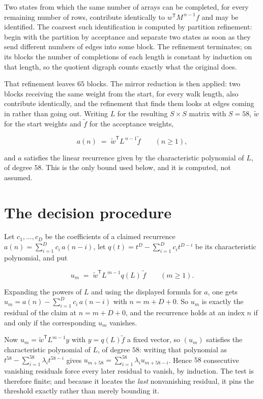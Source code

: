 \documentclass[11pt]{article}
\theoremstyle{definition}
\begin{document}
Two states from which the same number of arrays can be completed, for every remaining number of rows, contribute identically to $w^{\mathsf T}M^{\,n-1}f$ and may be identified. The coarsest such identification is computed by partition refinement: begin with the partition by acceptance and separate two states as soon as they send different numbers of edges into some block. The refinement terminates; on its blocks the number of completions of each length is constant by induction on that length, so the quotient digraph counts exactly what the original does.

That refinement leaves $65$ blocks. The mirror reduction is then applied: two blocks receiving the same weight from the start, for every walk length, also contribute identically, and the refinement that finds them looks at edges coming in rather than going out. Writing $L$ for the resulting $S \times S$ matrix with $S = 58$, $\tilde w$ for the start weights and $\tilde f$ for the acceptance weights,

\[a(n) \;=\; \tilde w^{\mathsf T} L^{\,n-1} \tilde f \qquad (n \ge 1),\]

and $a$ satisfies the linear recurrence given by the characteristic polynomial of $L$, of degree $58$. This is the only bound used below, and it is computed, not assumed.

\section{The decision procedure}

Let $c_1,\dots,c_D$ be the coefficients of a claimed recurrence $a(n) = \sum_{i=1}^{D} c_i\,a(n-i)$, let $q(t) = t^{D} - \sum_{i=1}^{D} c_i t^{D-i}$ be its characteristic polynomial, and put

\[u_m \;=\; \tilde w^{\mathsf T} L^{\,m-1} q(L)\,\tilde f \qquad (m \ge 1).\]

Expanding the powers of $L$ and using the displayed formula for $a$, one gets $u_m = a(n) - \sum_{i=1}^{D} c_i\,a(n-i)$ with $n = m + D + 0$. So $u_m$ is exactly the residual of the claim at $n = m + D + 0$, and the recurrence holds at an index $n$ if and only if the corresponding $u_m$ vanishes.

Now $u_m = \tilde w^{\mathsf T} L^{m-1} y$ with $y = q(L)\tilde f$ a fixed vector, so $(u_m)$ satisfies the characteristic polynomial of $L$, of degree $58$: writing that polynomial as $t^{58} - \sum_{i=1}^{58} \lambda_i t^{58-i}$ gives $u_{m+58} = \sum_{i=1}^{58} \lambda_i u_{m+58-i}$. Hence $58$ consecutive vanishing residuals force every later residual to vanish, by induction. The test is therefore finite; and because it locates the {\itshape last} nonvanishing residual, it pins the threshold exactly rather than merely bounding it.
\end{document}

